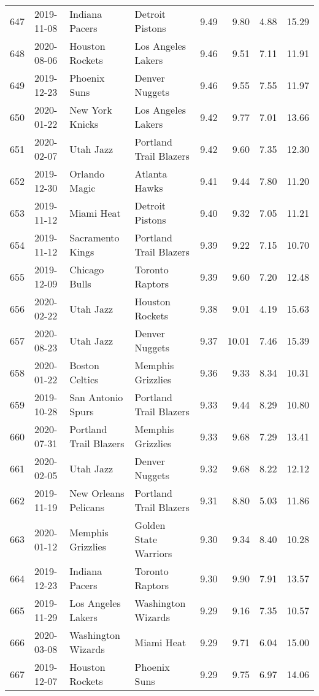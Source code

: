 \documentclass[
  11pt,
]{article}
\theoremstyle{nonumberplain}
\begin{document}
\begin{longtable}{rl|llr|rrr}
647 & 2019-11-08 & Indiana Pacers & Detroit Pistons & 9.49 & 9.80 & 4.88 & 15.29\\
648 & 2020-08-06 & Houston Rockets & Los Angeles Lakers & 9.46 & 9.51 & 7.11 & 11.91\\
649 & 2019-12-23 & Phoenix Suns & Denver Nuggets & 9.46 & 9.55 & 7.55 & 11.97\\
650 & 2020-01-22 & New York Knicks & Los Angeles Lakers & 9.42 & 9.77 & 7.01 & 13.66\\
651 & 2020-02-07 & Utah Jazz & Portland Trail Blazers & 9.42 & 9.60 & 7.35 & 12.30\\
652 & 2019-12-30 & Orlando Magic & Atlanta Hawks & 9.41 & 9.44 & 7.80 & 11.20\\
653 & 2019-11-12 & Miami Heat & Detroit Pistons & 9.40 & 9.32 & 7.05 & 11.21\\
654 & 2019-11-12 & Sacramento Kings & Portland Trail Blazers & 9.39 & 9.22 & 7.15 & 10.70\\
655 & 2019-12-09 & Chicago Bulls & Toronto Raptors & 9.39 & 9.60 & 7.20 & 12.48\\
656 & 2020-02-22 & Utah Jazz & Houston Rockets & 9.38 & 9.01 & 4.19 & 15.63\\
657 & 2020-08-23 & Utah Jazz & Denver Nuggets & 9.37 & 10.01 & 7.46 & 15.39\\
658 & 2020-01-22 & Boston Celtics & Memphis Grizzlies & 9.36 & 9.33 & 8.34 & 10.31\\
659 & 2019-10-28 & San Antonio Spurs & Portland Trail Blazers & 9.33 & 9.44 & 8.29 & 10.80\\
660 & 2020-07-31 & Portland Trail Blazers & Memphis Grizzlies & 9.33 & 9.68 & 7.29 & 13.41\\
661 & 2020-02-05 & Utah Jazz & Denver Nuggets & 9.32 & 9.68 & 8.22 & 12.12\\
662 & 2019-11-19 & New Orleans Pelicans & Portland Trail Blazers & 9.31 & 8.80 & 5.03 & 11.86\\
663 & 2020-01-12 & Memphis Grizzlies & Golden State Warriors & 9.30 & 9.34 & 8.40 & 10.28\\
664 & 2019-12-23 & Indiana Pacers & Toronto Raptors & 9.30 & 9.90 & 7.91 & 13.57\\
665 & 2019-11-29 & Los Angeles Lakers & Washington Wizards & 9.29 & 9.16 & 7.35 & 10.57\\
666 & 2020-03-08 & Washington Wizards & Miami Heat & 9.29 & 9.71 & 6.04 & 15.00\\
667 & 2019-12-07 & Houston Rockets & Phoenix Suns & 9.29 & 9.75 & 6.97 & 14.06\\

\end{longtable}
\end{document}
